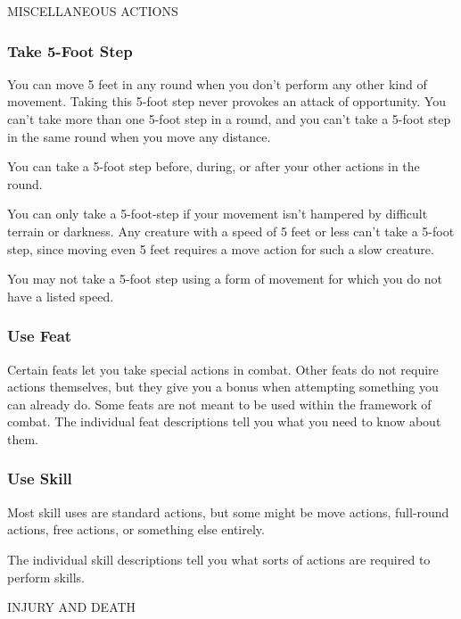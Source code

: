 \documentclass{article}
\begin{document}
\vspace{12pt}
MISCELLANEOUS ACTIONS

\vspace{12pt}
\subsubsection*{\textbf{Take 5-Foot Step}}

You can move 5 feet in any round when you don't perform any other kind of movement. 
Taking this 5-foot step never provokes an attack of opportunity. You can't take 
more than one 5-foot step in a round, and you can't take a 5-foot step in the same 
round when you move any distance.

You can take a 5-foot step before, during, or after your other actions in the round. 

You can only take a 5-foot-step if your movement isn't hampered by difficult terrain 
or darkness. Any creature with a speed of 5 feet or less can't take a 5-foot step, 
since moving even 5 feet requires a move action for such a slow creature.

You may not take a 5-foot step using a form of movement for which you do not have 
a listed speed. 

\vspace{12pt}
\subsubsection*{\textbf{Use Feat}}

Certain feats let you take special actions in combat. Other feats do not require 
actions themselves, but they give you a bonus when attempting something you can 
already do. Some feats are not meant to be used within the framework of combat. 
The individual feat descriptions tell you what you need to know about them.

\vspace{12pt}
\subsubsection*{\textbf{Use Skill}}

Most skill uses are standard actions, but some might be move actions, full-round 
actions, free actions, or something else entirely.

The individual skill descriptions tell you what sorts of actions are required to 
perform skills.

\vspace{12pt}
{\LARGE{}INJURY AND DEATH}
\end{document}
